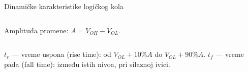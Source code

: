 \begin{frame}[label=08-s035]{Dinamičke karakteristike logičkog kola}
\centering\par\smallskip
\begin{columns}[T,onlytextwidth]
\centering

\centering

\end{columns}
Amplituda promene: $A=V_{OH}-V_{OL}$.\par\smallskip
\begin{columns}[T,onlytextwidth]
$t_r$ — vreme uspona (rise time): od $V_{OL}+10\%A$ do $V_{OL}+90\%A$.
$t_f$ — vreme pada (fall time): između istih nivoa, pri silaznoj ivici.
\end{columns}
\end{frame}
